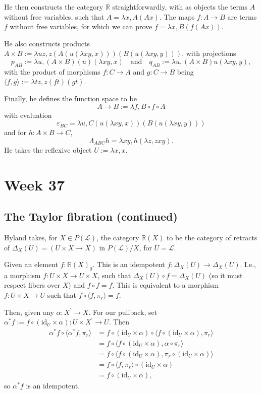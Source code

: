 \documentclass{amsbook}
\newcommand{\Ob}[1]{{#1}_0}
\newcommand{\id}[1]{\ensuremath{\text{id}_{#1}}}
\theoremstyle{definition}
\begin{document}
  He then constructs the category $ \mathbb R $ straightforwardly, with as objects the terms $ A $ without free variables, such that $ A = \lambda x, A (A x) $. The maps $ f: A \to B $ are terms $ f $ without free variables, for which we can prove $ f = \lambda x, B (f (A x)) $.

  He also constructs products $ A \times B := \lambda u z, z(A(u(\lambda x y, x)))(B(u(\lambda x y, y))) $, with projections
  \[ p_{AB} := \lambda u, (A \times B)(u)(\lambda xy, x) \quad \text{and} \quad q_{AB} := \lambda u, (A \times B) u (\lambda xy, y), \]
  with the product of morphisms $ f: C \to A $ and $ g: C \to B $ being $ \langle f, g \rangle := \lambda t z, z(f t)(g t) $.

  Finally, he defines the function space to be
  \[ A \to B := \lambda f, B \circ f \circ A \]
  with evaluation
  \[ \varepsilon_{BC} = \lambda u, C(u(\lambda x y, x))(B(u(\lambda x y, y))) \]
  and for $ h: A \times B \to C $,
  \[ \Lambda_{ABC} h = \lambda x y, h (\lambda z, z x y). \]
  He takes the reflexive object $ U := \lambda x, x $.

  \chapter*{Week 37}
  \section{The Taylor fibration (continued)}
  Hyland takes, for $ X \in P(\mathcal L) $, the category $ \mathbb R(X) $ to be the category of retracts of $ \Delta_X(U) = (U \times X \to X) $ in $ P(\mathcal L) / X $, for $ U = \mathcal L $.

  Given an element $ f: \Ob{\mathbb R(X)} $. This is an idempotent $ f: \Delta_X(U) \to \Delta_X(U) $. I.e., a morphism $ f: U \times X \to U \times X $, such that $ \Delta_X(U) \circ f = \Delta_X(U) $ (so it must respect fibers over $ X $) and $ f \circ f = f $. This is equivalent to a morphism $ f: U \times X \to U $ such that $ f \circ \langle f, \pi_r \rangle = f $.

  Then, given any $ \alpha: X^\prime \to X $. For our pullback, set $ \alpha^* f := f \circ (\id U \times \alpha) : U \times X^\prime \to U $. Then
  \begin{align*}
    \alpha^* f \circ \langle \alpha^* f, \pi_r \rangle
    &= f \circ (\id U \times \alpha) \circ \langle f \circ (\id U \times \alpha), \pi_r \rangle\\
    &= f \circ \langle f \circ (\id U \times \alpha), \alpha \circ \pi_r \rangle\\
    &= f \circ \langle f \circ (\id U \times \alpha), \pi_r \circ (\id U \times \alpha) \rangle \\
    &= f \circ \langle f, \pi_r \rangle \circ (\id U \times \alpha)\\
    &= f \circ (\id U \times \alpha),
  \end{align*}
  so $ \alpha^* f $ is an idempotent.
\end{document}
